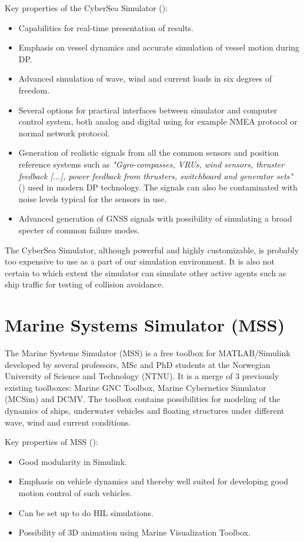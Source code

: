 Key properties of the CyberSea Simulator (\cite{HILtestingDP}):
\begin{itemize}
\item Capabilities for real-time presentation of results.
\item Emphasis on vessel dynamics and accurate simulation of vessel motion during DP.
\item Advanced simulation of wave, wind and current loads in six degrees of freedom.
\item Several options for practical interfaces between simulator and computer control system, both analog and digital using for example NMEA protocol or normal network protocol.
\item Generation of realistic signals from all the common sensors and position reference systems such as \textit{"Gyro-compasses, VRUs, wind sensors, thruster feedback [...], power feedback from thrusters, switchboard and generator sets"} (\cite{HILtestingDP}) used in modern DP technology. The signals can also be contaminated with noise levels typical for the sensors in use.
\item Advanced generation of GNSS signals with possibility of simulating a broad specter of common failure modes.
\end{itemize}

The CyberSea Simulator, although powerful and highly customizable, is probably too expensive to use as a part of our simulation environment. It is also not certain to which extent the simulator can simulate other active agents such as ship traffic for testing of collision avoidance. 


\section{Marine Systems Simulator (MSS)}
The Marine Systems Simulator (MSS) is a free toolbox for MATLAB/Simulink developed by several professors, MSc and PhD students at the Norwegian University of Science and Technology (NTNU). It is a merge of 3 previously existing toolboxes: Marine GNC Toolbox, Marine Cybernetics Simulator (MCSim) and DCMV. The toolbox contains possibilities for modeling of the dynamics of ships, underwater vehicles and floating structures under different wave, wind and current conditions.

Key properties of MSS (\cite{MSSoverview}):
\begin{itemize}
\item Good modularity in Simulink.
\item Emphasis on vehicle dynamics and thereby well suited for developing good motion control of such vehicles.
\item Can be set up to do HIL simulations.
\item Possibility of 3D animation using Marine Visualization Toolbox.
\end{itemize}

